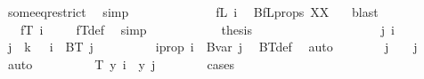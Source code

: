 \begin{isabellebody}
\ some{\isacharunderscore}{\kern0pt}eq{\isacharunderscore}{\kern0pt}restrict\ \isamarkupfalse%
\ simp\isanewline
\ \ \ \ \ \ \ \ \isamarkupfalse%
\ \isamarkupfalse%
\ {\isachardoublequoteopen}{\isachardot}{\kern0pt}{\isachardot}{\kern0pt}{\isachardot}{\kern0pt}\ {\isacharequal}{\kern0pt}\ fL\ i{\isachardoublequoteclose}\ \isamarkupfalse%
\ BfL{\isacharunderscore}{\kern0pt}props{\isacharparenleft}{\kern0pt}{}{\isacharparenright}{\kern0pt}\ XX\ {}\ \isamarkupfalse%
\ blast\isanewline
\ \ \ \ \ \ \ \ \isamarkupfalse%
\ \isamarkupfalse%
\ {\isachardoublequoteopen}{\isachardot}{\kern0pt}{\isachardot}{\kern0pt}{\isachardot}{\kern0pt}\ {\isacharequal}{\kern0pt}\ fT\ i{\isachardoublequoteclose}\ \isamarkupfalse%
\ {}\ \isamarkupfalse%
\ fT{\isacharunderscore}{\kern0pt}def\ \isamarkupfalse%
\ simp\isanewline
\ \ \ \ \ \ \ \ \isamarkupfalse%
\ \isamarkupfalse%
\ {\isacharquery}{\kern0pt}thesis\ \isacommand{{\isachardot}{\kern0pt}}\isamarkupfalse%
\isanewline
\ \ \ \ \ \ \isamarkupfalse%
\isanewline
\ \ \ \ \isamarkupfalse%
\isanewline
\ \ \ \ \ \ \isamarkupfalse%
\ j\ i\ \isamarkupfalse%
\ {\isachardoublequoteopen}j\ {\isacharless}{\kern0pt}\ k\ {\isacharplus}{\kern0pt}\ {}{\isachardoublequoteclose}\ {\isachardoublequoteopen}i\ {\isasymin}\ BT\ j{\isachardoublequoteclose}\isanewline
\ \ \ \ \ \ \isamarkupfalse%
\ \isamarkupfalse%
\ i{\isacharunderscore}{\kern0pt}prop{\isacharcolon}{\kern0pt}\ {\isachardoublequoteopen}i\ {\isasymin}\ Bvar\ j{\isachardoublequoteclose}\ \isamarkupfalse%
\ BT{\isacharunderscore}{\kern0pt}def\ \isamarkupfalse%
\ auto\isanewline
\ \ \ \ \ \ \isamarkupfalse%
\ {\isachardoublequoteopen}j\ {\isacharequal}{\kern0pt}\ {}{\isachardoublequoteclose}\ {\isacharbar}{\kern0pt}\ {\isachardoublequoteopen}j\ {\isachargreater}{\kern0pt}\ {}{\isachardoublequoteclose}\ \isamarkupfalse%
\ auto\isanewline
\ \ \ \ \ \ \isamarkupfalse%
\ \isamarkupfalse%
\ {\isachardoublequoteopen}T\ y\ i\ {\isacharequal}{\kern0pt}\ y\ j{\isachardoublequoteclose}\isanewline
\ \ \ \ \ \ \isamarkupfalse%
\ cases\isanewline
\ \ \ \ \ \ \ \ \isamarkupfalse%
\ {}\isanewline

\end{isabellebody}
